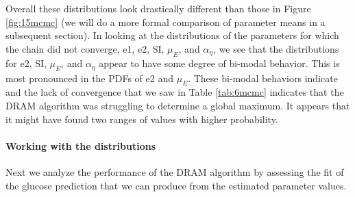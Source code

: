 Overall these distributions look drastically different than those in Figure \ref{fig:15mcmc} (we will do a more formal comparison of parameter means in a subsequent section). In looking at the distributions of the parameters for which the chain did not converge, e1, e2, SI,  $\mu_E$, and $\alpha_\eta$, we see that the distributions for e2, SI, $\mu_E$, and $\alpha_\eta$ appear to have some degree of bi-modal behavior. This is most pronounced in the PDFs of e2 and $\mu_E$. These bi-modal behaviors indicate and the lack of convergence that we saw in Table \ref{tab:6mcmc} indicates that the DRAM algorithm was struggling to determine a global maximum. It appears that it might have found two ranges of values with higher probability.
\paragraph{Working with the distributions}
Next we analyze the performance of the DRAM algorithm by assessing the fit of the glucose prediction that we can produce from the estimated parameter values.
